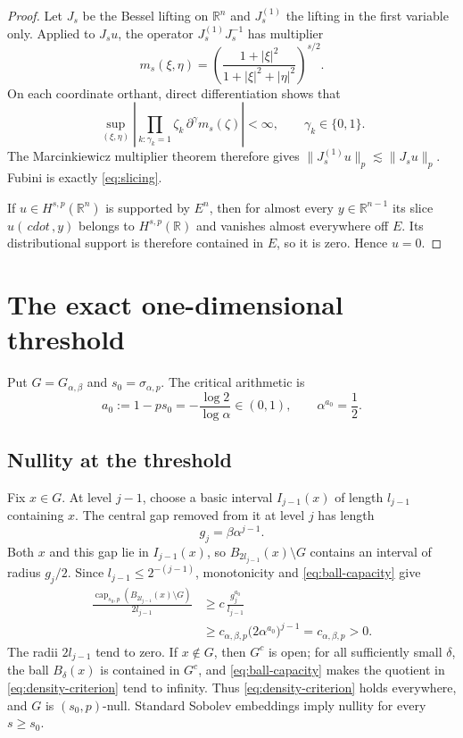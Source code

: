 \documentclass[11pt]{article}
\newcommand{\R}{\mathbb R}
\newcommand{\bcap}{\operatorname{cap}}
\begin{document}
\begin{proof}
Let $J_s$ be the Bessel lifting on $\R^n$ and $J_s^{(1)}$ the lifting in
the first variable only.  Applied to $J_su$, the operator $J_s^{(1)}J_s^{-1}$
has multiplier
\[
 m_s(\xi,\eta)=
 \left(\frac{1+|\xi|^2}{1+|\xi|^2+|\eta|^2}\right)^{s/2}.
\]
On each coordinate orthant, direct differentiation shows that
\[
 \sup_{(\xi,\eta)}
 \left|\prod_{k:\gamma_k=1}\zeta_k\,
 \partial^\gamma m_s(\zeta)\right|<\infty,
 \qquad \gamma_k\in\{0,1\}.
\]
The Marcinkiewicz multiplier theorem therefore gives
$\|J_s^{(1)}u\|_p\lesssim\|J_su\|_p$.  Fubini is exactly
\eqref{eq:slicing}.

If $u\in H^{s,p}(\R^n)$ is supported by $E^n$, then for almost every
$y\in\R^{n-1}$ its slice $u(\,cdot\,,y)$ belongs to $H^{s,p}(\R)$ and
vanishes almost everywhere off $E$.  Its distributional support is therefore
contained in $E$, so it is zero.  Hence $u=0$.
\end{proof}

\section{The exact one-dimensional threshold}

Put $G=G_{\alpha,\beta}$ and $s_0=\sigma_{\alpha,p}$.  The critical
arithmetic is
\begin{equation}\label{eq:critical}
 a_0:=1-ps_0=-\frac{\log2}{\log\alpha}\in(0,1),
 \qquad \alpha^{a_0}=\frac12.
\end{equation}

\subsection*{Nullity at the threshold}

Fix $x\in G$.  At level $j-1$, choose a basic interval $I_{j-1}(x)$ of
length $l_{j-1}$ containing $x$.  The central gap removed from it at level
$j$ has length
\[
 g_j=\beta\alpha^{j-1}.
\]
Both $x$ and this gap lie in $I_{j-1}(x)$, so
$B_{2l_{j-1}}(x)\setminus G$ contains an interval of radius $g_j/2$.
Since $l_{j-1}\leq2^{-(j-1)}$, monotonicity and
\eqref{eq:ball-capacity} give
\begin{align*}
 \frac{\bcap_{s_0,p}(B_{2l_{j-1}}(x)\setminus G)}{2l_{j-1}}
 &\geq c\,\frac{g_j^{a_0}}{l_{j-1}}\\
 &\geq c_{\alpha,\beta,p}
       \bigl(2\alpha^{a_0}\bigr)^{j-1}
 =c_{\alpha,\beta,p}>0.
\end{align*}
The radii $2l_{j-1}$ tend to zero.  If $x\notin G$, then $G^c$ is open;
for all sufficiently small $\delta$, the ball $B_\delta(x)$ is contained in
$G^c$, and \eqref{eq:ball-capacity} makes the quotient in
\eqref{eq:density-criterion} tend to infinity.  Thus
\eqref{eq:density-criterion} holds everywhere, and $G$ is
$(s_0,p)$-null.  Standard Sobolev embeddings imply nullity for every
$s\geq s_0$.
\end{document}
